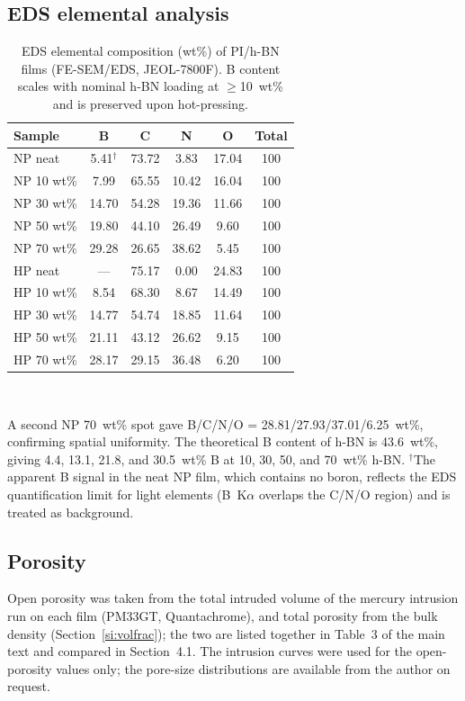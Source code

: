 \documentclass[10pt,a4paper]{article}
\begin{document}
\subsection{EDS elemental analysis}
\begin{table}[htbp]
\centering
\caption{EDS elemental composition (wt\%) of PI/h-BN films (FE-SEM/EDS, JEOL-7800F). B content scales with nominal h-BN loading at $\geq$10~wt\% and is preserved upon hot-pressing.}
\label{tab:S1}
\small
\begin{tabular}{@{}lccccc@{}}
\toprule
Sample & B & C & N & O & Total \\
\midrule
NP neat     & 5.41$^{\dagger}$  & 73.72 & 3.83  & 17.04 & 100 \\
NP 10 wt\%  & 7.99  & 65.55 & 10.42 & 16.04 & 100 \\
NP 30 wt\%  & 14.70 & 54.28 & 19.36 & 11.66 & 100 \\
NP 50 wt\%  & 19.80 & 44.10 & 26.49 & 9.60  & 100 \\
NP 70 wt\%  & 29.28 & 26.65 & 38.62 & 5.45  & 100 \\
HP neat     & ---   & 75.17 & 0.00  & 24.83 & 100 \\
HP 10 wt\%  & 8.54  & 68.30 & 8.67  & 14.49 & 100 \\
HP 30 wt\%  & 14.77 & 54.74 & 18.85 & 11.64 & 100 \\
HP 50 wt\%  & 21.11 & 43.12 & 26.62 & 9.15  & 100 \\
HP 70 wt\%  & 28.17 & 29.15 & 36.48 & 6.20  & 100 \\
\bottomrule
\end{tabular}\\[3pt]
\parbox{0.85\linewidth}{\footnotesize A second NP 70~wt\% spot gave B/C/N/O = 28.81/27.93/37.01/6.25~wt\%, confirming spatial uniformity. The theoretical B content of h-BN is 43.6~wt\%, giving 4.4, 13.1, 21.8, and 30.5~wt\% B at 10, 30, 50, and 70~wt\% h-BN. $^{\dagger}$The apparent B signal in the neat NP film, which contains no boron, reflects the EDS quantification limit for light elements (B~K$\alpha$ overlaps the C/N/O region) and is treated as background.}
\end{table}

\subsection{Porosity}
Open porosity was taken from the total intruded volume of the mercury intrusion run on each film (PM33GT, Quantachrome), and total porosity from the bulk density (Section~\ref{si:volfrac}); the two are listed together in Table~3 of the main text and compared in Section~4.1. The intrusion curves were used for the open-porosity values only; the pore-size distributions are available from the author on request.
\end{document}
